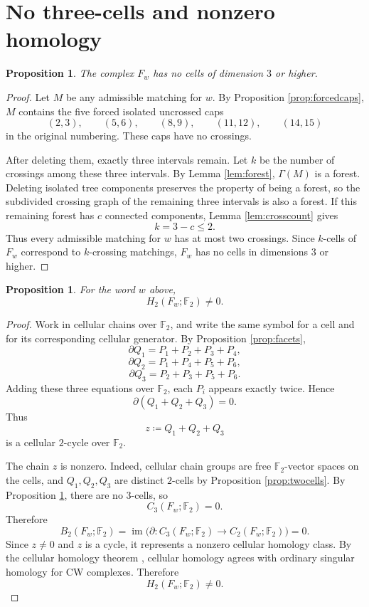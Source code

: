 \documentclass[12pt]{article}
\newcommand{\Ftwo}{\mathbb{F}_2}
\newcommand{\defeq}{\coloneqq}
\newtheorem{proposition}[theorem]{Proposition}
\theoremstyle{definition}
\begin{document}
\section{No three-cells and nonzero homology}

\begin{proposition}\label{prop:nohigh}
The complex \(F_w\) has no cells of dimension \(3\) or higher.
\end{proposition}

\begin{proof}
Let \(M\) be any admissible matching for \(w\).  By Proposition \ref{prop:forcedcaps}, \(M\) contains the five forced isolated uncrossed caps
\[
(2,3),\qquad (5,6),\qquad (8,9),\qquad (11,12),\qquad (14,15)
\]
in the original numbering.  These caps have no crossings.

After deleting them, exactly three intervals remain.  Let \(k\) be the number of crossings among these three intervals.  By Lemma \ref{lem:forest}, \(\Gamma(M)\) is a forest.  Deleting isolated tree components preserves the property of being a forest, so the subdivided crossing graph of the remaining three intervals is also a forest.  If this remaining forest has \(c\) connected components, Lemma \ref{lem:crosscount} gives
\[
k=3-c\le 2.
\]
Thus every admissible matching for \(w\) has at most two crossings.  Since \(k\)-cells of \(F_w\) correspond to \(k\)-crossing matchings, \(F_w\) has no cells in dimensions \(3\) or higher.
\end{proof}

\begin{proposition}\label{prop:homology}
For the word \(w\) above,
\[
H_2(F_w;\Ftwo)\neq 0.
\]
\end{proposition}

\begin{proof}
Work in cellular chains over \(\Ftwo\), and write the same symbol for a cell and for its corresponding cellular generator.  By Proposition \ref{prop:facets},
\[
\partial Q_1=P_1+P_2+P_3+P_4,
\]
\[
\partial Q_2=P_1+P_4+P_5+P_6,
\]
\[
\partial Q_3=P_2+P_3+P_5+P_6.
\]
Adding these three equations over \(\Ftwo\), each \(P_i\) appears exactly twice.  Hence
\[
\partial(Q_1+Q_2+Q_3)=0.
\]
Thus
\[
z\defeq Q_1+Q_2+Q_3
\]
is a cellular \(2\)-cycle over \(\Ftwo\).

The chain \(z\) is nonzero.  Indeed, cellular chain groups are free \(\Ftwo\)-vector spaces on the cells, and \(Q_1,Q_2,Q_3\) are distinct \(2\)-cells by Proposition \ref{prop:twocells}.  By Proposition \ref{prop:nohigh}, there are no \(3\)-cells, so
\[
C_3(F_w;\Ftwo)=0.
\]
Therefore
\[
B_2(F_w;\Ftwo)=\operatorname{im}\bigl(\partial:C_3(F_w;\Ftwo)\to C_2(F_w;\Ftwo)\bigr)=0.
\]
Since \(z\neq 0\) and \(z\) is a cycle, it represents a nonzero cellular homology class.  By the cellular homology theorem \cite[Chapter 2]{Hatcher}, cellular homology agrees with ordinary singular homology for CW complexes.  Therefore
\[
H_2(F_w;\Ftwo)\neq 0.
\]
\end{proof}
\end{document}
